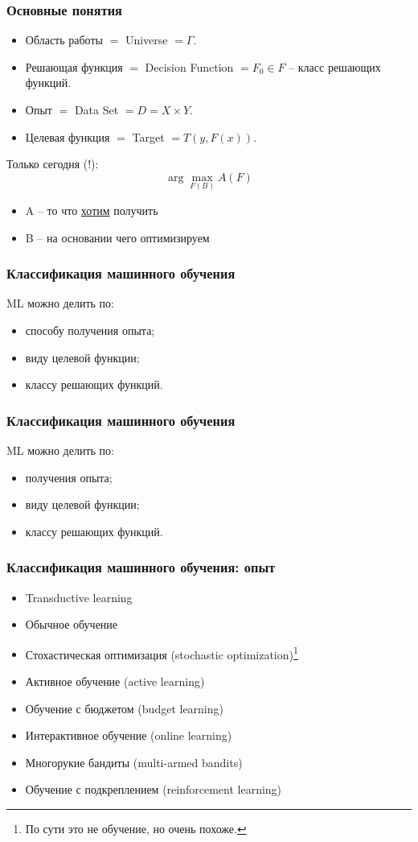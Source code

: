 \documentclass[14pt, fleqn, xcolor={dvipsnames, table}]{beamer}
\begin{document}
\begin{frame}
\frametitle{Основные понятия}
\begin{itemize}
	\item Область работы $=$ Universe $=\Gamma$.
	\item Решающая функция $=$ Decision Function $= F_0 \in F$ -- класс решающих функций.
	\item Опыт $=$ Data Set $=D = X \times Y$.
	\item Целевая функция $=$ Target $=T(y,F(x))$.
\end{itemize}
\begin{small}
Только сегодня (!):
$$
\arg \max_{F(B)} A(F)
$$
\begin{itemize}
	\item A -- то что \underline{хотим} получить
	\item B -- на основании чего оптимизируем
\end{itemize}
\end{small}
\end{frame}

\begin{frame}
\frametitle{Классификация машинного обучения}
ML можно делить по:
\begin{itemize}
	\item способу получения опыта;
	\item виду целевой функции;
	\item классу решающих функций.
\end{itemize}
\end{frame}

\begin{frame}
\frametitle{Классификация машинного обучения}
ML можно делить по:
\begin{itemize}
	\item { получения опыта;}
	\item виду целевой функции;
	\item классу решающих функций.
\end{itemize}
\end{frame}


\begin{frame}
\frametitle{Классификация машинного обучения: опыт}
\begin{itemize}
	\item Transductive learning
	\item Обычное обучение
	\item Стохастическая оптимизация (stochastic optimization)\footnote{По сути это не обучение, но очень похоже.}
	\item Активное обучение (active learning)
	\item Обучение с бюджетом (budget learning) 
	\item Интерактивное обучение (online learning)
	\item Многорукие бандиты (multi-armed bandits)
	\item Обучение с подкреплением (reinforcement learning) 
\end{itemize}
\end{frame}
\end{document}

